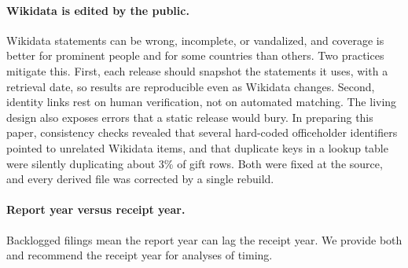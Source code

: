 \documentclass[11pt]{article}
\begin{document}
\paragraph{Wikidata is edited by the public.} Wikidata statements can be wrong, incomplete, or vandalized, and coverage is better for prominent people and for some countries than others. Two practices mitigate this. First, each release should snapshot the statements it uses, with a retrieval date, so results are reproducible even as Wikidata changes. Second, identity links rest on human verification, not on automated matching. The living design also exposes errors that a static release would bury. In preparing this paper, consistency checks revealed that several hard-coded officeholder identifiers pointed to unrelated Wikidata items, and that duplicate keys in a lookup table were silently duplicating about 3\% of gift rows. Both were fixed at the source, and every derived file was corrected by a single rebuild.

\paragraph{Report year versus receipt year.} Backlogged filings mean the report year can lag the receipt year. We provide both and recommend the receipt year for analyses of timing.
\end{document}

